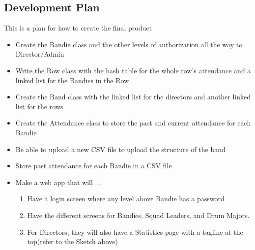 \documentclass{article}
\begin{document}
\subsection{Development Plan}
This is a plan for how to create the final product
\begin{itemize}
	\item Create the Bandie class and the other levels of authorization all the way to Director/Admin
	\item Write the Row class with the hash table for the whole row’s attendance and a linked list for the Bandies in the Row
	\item Create the Band class with the linked list for the directors and another linked list for the rows
	\item Create the Attendance class to store the past and current attendance for each Bandie
	\item Be able to upload a new CSV file to upload the structure of the band
	\item Store past attendance for each Bandie in a CSV file
	\item Make a web app that will ...
		\begin{enumerate}
			\item Have a login screen where any level above Bandie has a password
			\item Have the different screens for Bandies, Squad Leaders, and Drum Majors.
			\item For Directors, they will also have a Statistics page with a tagline at the top(refer to the Sketch above)
		\end{enumerate}
\end{itemize}
\end{document}
